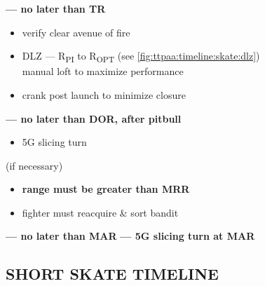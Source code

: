 \begin{checklistenumerate}[start=0]
     \textbf{--- no later than TR}
    \label{subsec:ttpaa:timeline:skate:shoot}
    \begin{itemize} 
        \item verify clear avenue of fire
        \item DLZ --- R\textsubscript{PI} to R\textsubscript{OPT}
        \hfill (see \cref{fig:ttpaa:timeline:skate:dlz})\\
        manual loft to maximize performance
        \item crank post launch to minimize closure
    \end{itemize}
    

    \blueitem[Out] \textbf{--- no later than DOR, after pitbull}
    \label{subsec:ttpaa:timeline:skate:out}
    \begin{itemize}
        \item 5G slicing turn
    \end{itemize}
    \blueitem[Recommit] (if necessary)
    \label{subsec:ttpaa:timeline:skate:recommit}
    \begin{itemize}
        \item \textbf{range must be greater than MRR}
        \item fighter must reacquire \& sort bandit
    \end{itemize}
     \textbf{--- no later than MAR}
    \label{subsec:ttpaa:timeline:skate:shoot2}
    \blueitem[Abort]%
    \label{subsec:ttpaa:timeline:skate:abort}
    \textbf{--- 5G slicing turn at MAR}
\end{checklistenumerate}

\clearpage

\subsection{SHORT SKATE TIMELINE}
\label{subsec:ttpaa:timeline:shortskate}

